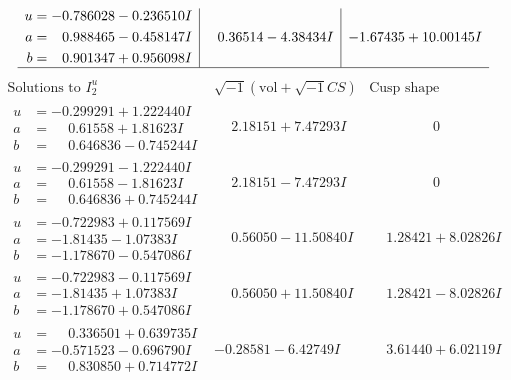 \documentclass[1p]{elsarticle_modified}
\theoremstyle{definition}
\newcommand{\I}{\sqrt{-1}}
\begin{document}
$$\begin{array}{c|c|c}
\begin{aligned}
u &= -0.786028 - 0.236510 I \\
a &= \phantom{-}0.988465 - 0.458147 I \\
b &= \phantom{-}0.901347 + 0.956098 I\end{aligned}
 & \phantom{-}0.36514 - 4.38434 I & -1.67435 + 10.00145 I\\
 \hline 
 \end{array}$$\newpage$$\begin{array}{c|c|c}  
\text{Solutions to }I^u_{2}& \I (\text{vol} + \sqrt{-1}CS) & \text{Cusp shape}\\
 \hline 
\begin{aligned}
u &= -0.299291 + 1.222440 I \\
a &= \phantom{-}0.61558 + 1.81623 I \\
b &= \phantom{-}0.646836 - 0.745244 I\end{aligned}
 & \phantom{-}2.18151 + 7.47293 I & \phantom{-0.000000 } 0 \\ \hline\begin{aligned}
u &= -0.299291 - 1.222440 I \\
a &= \phantom{-}0.61558 - 1.81623 I \\
b &= \phantom{-}0.646836 + 0.745244 I\end{aligned}
 & \phantom{-}2.18151 - 7.47293 I & \phantom{-0.000000 } 0 \\ \hline\begin{aligned}
u &= -0.722983 + 0.117569 I \\
a &= -1.81435 - 1.07383 I \\
b &= -1.178670 - 0.547086 I\end{aligned}
 & \phantom{-}0.56050 - 11.50840 I & \phantom{-}1.28421 + 8.02826 I \\ \hline\begin{aligned}
u &= -0.722983 - 0.117569 I \\
a &= -1.81435 + 1.07383 I \\
b &= -1.178670 + 0.547086 I\end{aligned}
 & \phantom{-}0.56050 + 11.50840 I & \phantom{-}1.28421 - 8.02826 I \\ \hline\begin{aligned}
u &= \phantom{-}0.336501 + 0.639735 I \\
a &= -0.571523 - 0.696790 I \\
b &= \phantom{-}0.830850 + 0.714772 I\end{aligned}
 & -0.28581 - 6.42749 I & \phantom{-}3.61440 + 6.02119 I \\ \hline\begin{aligned}

\end{aligned}
\end{array}$$
\end{document}

